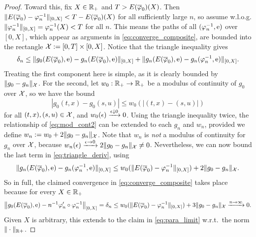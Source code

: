 \begin{proof}
    Toward this, fix $X\in\mathbb{R}_+$ and $T>E(\overline{\varphi}_0)(X)$. Then $\Vert E(\overline{\varphi}_0)-\varphi^{-1}_n \Vert_{[0,X]}<T-E(\overline{\varphi}_0)(X)$ for all sufficiently large $n$, so assume w.l.o.g. $\Vert\varphi_n^{-1}\Vert_{[0,X]} = \varphi_n^{-1}(X)<T$ for all $n$. This means the paths of all $(\varphi_n^{-1},\mathrm{e})$ over $[0,X]$, which appear as arguments in \autoref{eq:converge_composite}, are bounded into the rectangle $\mathcal{X}:=[0,T]\times[0,X]$. Notice that the triangle inequality gives
    \begin{equation}\label{eq:triangle_deriv}
        \delta_n \le \Vert g_0(E(\overline{\varphi}_0),\mathrm{e}) - g_n(E(\overline{\varphi}_0),\mathrm{e})\Vert_{[0,X]} + \Vert g_n(E(\overline{\varphi}_0),\mathrm{e}) - g_n(\varphi^{-1}_n,\mathrm{e})\Vert_{[0,X]}.
    \end{equation}
    Treating the first component here is simple, as it is clearly bounded by $\Vert g_0 - g_n\Vert_{\mathcal{X}}$. For the second, let $w_0:\mathbb{R}_+\to\mathbb{R}_+$ be a modulus of continuity of $g_0$ over $\mathcal{X}$, so we have the bound
    \begin{equation}\label{eq:mod_cont2}
        |g_0(t,x) - g_0(s,u)| \le w_0(|(t,x) - (s,u)|)
    \end{equation}
    for all $(t,x),(s,u)\in\mathcal{X}$, and $w_0(\epsilon)\xrightarrow{\epsilon\downarrow0}0$. Using the triangle inequality twice, the relationship of \autoref{eq:mod_cont2} can be extended to each $g_n$ and $w_n$, provided we define $w_n:=w_0 + 2\Vert g_0-g_n\Vert_{\mathcal{X}}$. Note that $w_n$ is \emph{not} a modulus of continuity for $g_n$ over $\mathcal{X}$, because $w_n(\epsilon)\xrightarrow{\epsilon\to 0}2\Vert g_0-g_n\Vert_{\mathcal{X}}\neq0$. Nevertheless, we can now bound the last term in \autoref{eq:triangle_deriv}, using
    \begin{equation}
        \Vert g_n(E(\overline{\varphi}_0),\mathrm{e}) - g_n(\varphi^{-1}_n,\mathrm{e})\Vert_{[0,X]} \le w_0(\Vert E(\overline{\varphi}_0)-\varphi^{-1}_n \Vert_{[0,X]}) + 2\Vert g_0 - g_n\Vert_{\mathcal{X}}.
    \end{equation}
    So in full, the claimed convergence in \autoref{eq:converge_composite} takes place because for every $X\in\mathbb{R}_+$
    \begin{equation}
        \left\Vert g_0(E(\overline{\varphi}_0),\mathrm{e}) - n^{-1}\varphi'_n\circ\varphi_n^{-1}\right\Vert_{[0,X]} = \delta_n \le w_0(\Vert E(\overline{\varphi}_0)-\varphi^{-1}_n \Vert_{[0,X]}) + 3\Vert g_0 - g_n\Vert_{\mathcal{X}} \xrightarrow{n\to\infty}  0.
    \end{equation}
    Given $X$ is arbitrary, this extends to the claim in \autoref{eq:para_limit} w.r.t.~the norm $\Vert\cdot\Vert_{\mathbb{R}+}$.
\end{proof}

